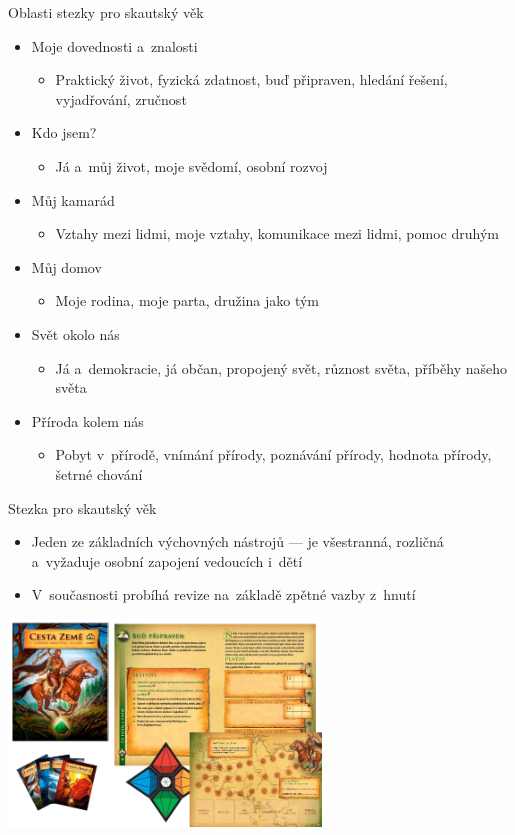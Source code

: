 \documentclass[compress, ucs, xelatex, 11pt, xcolor=dvipsnames, print,
	hyperref={
		bookmarks=true,
		unicode=true,
		colorlinks=true,
		pdftitle={Skautska vychovna metoda},
		plainpages=false,
		pdfauthor={Vojtech Zeisek},
		pdfsubject={Skautska vychovna metoda a jeji vyvoj za posledni stoleti a desetileti},
		pdfcreator={XeLaTeX},
		pdfkeywords={Junak, Pedagogika, Skaut, Skauting, Vychovna metoda},
		linkcolor=Black,
		anchorcolor=Black,
		citecolor=OliveGreen,
		filecolor=OliveGreen,
		menucolor=Black,
		urlcolor=OliveGreen,
		pdftex},
	url={hyphens, lowtilde} %
	]{beamer}
\begin{document}
\begin{frame}{Oblasti stezky pro skautský věk}
	\begin{itemize}
		\item Moje dovednosti a~znalosti
		\begin{itemize}
			\item Praktický život, fyzická zdatnost, buď připraven, hledání řešení, vyjadřování, zručnost
		\end{itemize}
		\item Kdo jsem?
		\begin{itemize}
			\item Já a~můj život, moje svědomí, osobní rozvoj
		\end{itemize}
		\item Můj kamarád
		\begin{itemize}
			\item Vztahy mezi lidmi, moje vztahy, komunikace mezi lidmi, pomoc druhým
		\end{itemize}
		\item Můj domov
		\begin{itemize}
			\item Moje rodina, moje parta, družina jako tým
		\end{itemize}
		\item Svět okolo nás
		\begin{itemize}
			\item Já a~demokracie, já občan, propojený svět, různost světa, příběhy našeho světa
		\end{itemize}
		\item Příroda kolem nás
		\begin{itemize}
			\item Pobyt v~přírodě, vnímání přírody, poznávání přírody, hodnota přírody, šetrné chování
		\end{itemize}
	\end{itemize}
\end{frame}

\begin{frame}{Stezka pro skautský věk}
	\begin{itemize}
		\item Jeden ze základních výchovných nástrojů --- je všestranná, rozličná a~vyžaduje osobní zapojení vedoucích i~dětí
		\item V~současnosti probíhá revize na~základě zpětné vazby z~hnutí
	\end{itemize}
	\begin{center}
		\includegraphics[height=5.5cm]{stezka.png}
	\end{center}
\end{frame}
\end{document}
